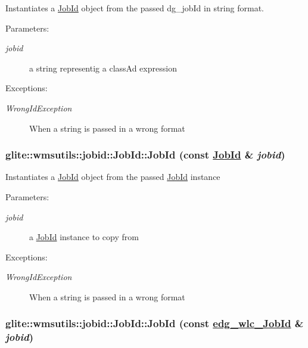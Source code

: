 Instantiates a \hyperlink{classglite_1_1wmsutils_1_1jobid_1_1JobId}{Job\-Id} object from the passed dg\_\-job\-Id in string format. \begin{Desc}
\item[Parameters:]
\begin{description}
\item[{\em jobid}]a string representig a class\-Ad expression \end{description}
\end{Desc}
\begin{Desc}
\item[Exceptions:]
\begin{description}
\item[{\em Wrong\-Id\-Exception}]When a string is passed in a wrong format \end{description}
\end{Desc}
\hypertarget{classglite_1_1wmsutils_1_1jobid_1_1JobId_z1_2}{
\subsubsection[JobId]{\setlength{\rightskip}{0pt plus 5cm}glite::wmsutils::jobid::Job\-Id::Job\-Id (const \hyperlink{classglite_1_1wmsutils_1_1jobid_1_1JobId}{Job\-Id} \& {\em jobid})}}
\label{classglite_1_1wmsutils_1_1jobid_1_1JobId_z1_2}


Instantiates a \hyperlink{classglite_1_1wmsutils_1_1jobid_1_1JobId}{Job\-Id} object from the passed \hyperlink{classglite_1_1wmsutils_1_1jobid_1_1JobId}{Job\-Id} instance \begin{Desc}
\item[Parameters:]
\begin{description}
\item[{\em jobid}]a \hyperlink{classglite_1_1wmsutils_1_1jobid_1_1JobId}{Job\-Id} instance to copy from \end{description}
\end{Desc}
\begin{Desc}
\item[Exceptions:]
\begin{description}
\item[{\em Wrong\-Id\-Exception}]When a string is passed in a wrong format \end{description}
\end{Desc}
\hypertarget{classglite_1_1wmsutils_1_1jobid_1_1JobId_z1_3}{
\subsubsection[JobId]{\setlength{\rightskip}{0pt plus 5cm}glite::wmsutils::jobid::Job\-Id::Job\-Id (const \hyperlink{cjobid_8h_a2}{edg\_\-wlc\_\-Job\-Id} \& {\em jobid})}}
\label{classglite_1_1wmsutils_1_1jobid_1_1JobId_z1_3}



